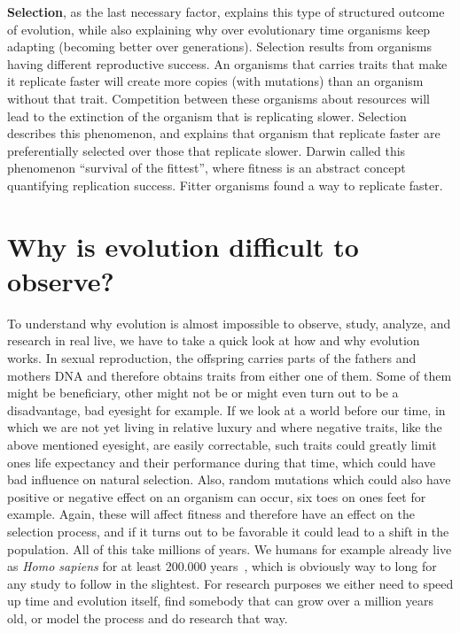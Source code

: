 \documentclass[12pt,oneside,listof=totoc,paper=a4,headings=small]{scrbook}
\begin{document}
\newpage
\textbf{Selection}, as the last necessary factor, explains this type of structured outcome of evolution, while also explaining why over evolutionary time organisms keep adapting (becoming better over generations). Selection results from organisms having different reproductive success. An organisms that carries traits that make it replicate faster will create more copies (with mutations) than an organism without that trait. Competition between these organisms about resources will lead to the extinction of the organism that is replicating slower. Selection describes this phenomenon, and explains that organism that replicate faster are preferentially selected over those that replicate slower. Darwin called this phenomenon ``survival of the fittest'', where fitness is an abstract concept quantifying replication success. Fitter organisms found a way to replicate faster.

\section{Why is evolution difficult to observe?}
To understand why evolution is almost impossible to observe, study, analyze, and research in real live, we have to take a quick look at how and why evolution works.
In sexual reproduction, the offspring carries parts of the fathers and mothers DNA and therefore obtains traits from either one of them. Some of them might be beneficiary, other might not be or might even turn out to be a disadvantage, bad eyesight for example. If we look at a world before our time, in which we are not yet living in relative luxury and where negative traits, like the above mentioned eyesight, are easily correctable, such traits could greatly limit ones life expectancy and their performance during that time, which could have bad influence on natural selection.
Also, random mutations which could also have positive or negative effect on an organism can occur, six toes on ones feet for example. Again, these will affect fitness and therefore have an effect on the selection process, and if it turns out to be favorable it could lead to a shift in the population.
All of this take millions of years. We humans for example already live as \textit{Homo sapiens} for at least 200.000 years~\cite{mcdougall2005stratigraphic}, which is obviously way to long for any study to follow in the slightest. For research purposes we either need to speed up time and evolution itself, find somebody that can grow over a million years old, or model the process and do research that way.
\end{document}
